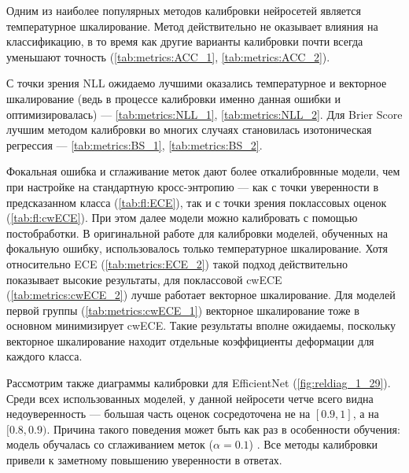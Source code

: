 \documentclass[12pt]{article}
\begin{document}
Одним из наиболее популярных методов калибровки нейросетей является температурное шкалирование. Метод действительно не оказывает влияния на классификацию, в то время как другие варианты калибровки почти всегда уменьшают точность (\autoref{tab:metrics:ACC_1}, \autoref{tab:metrics:ACC_2}). 

С точки зрения NLL ожидаемо лучшими оказались температурное и векторное шкалирование (ведь в процессе калибровки именно данная ошибки и оптимизировалась) --- \autoref{tab:metrics:NLL_1}, \autoref{tab:metrics:NLL_2}. Для Brier Score лучшим методом калибровки во многих случаях становилась изотоническая регрессия --- \autoref{tab:metrics:BS_1}, \autoref{tab:metrics:BS_2}. 

\begin{table}[h!]
    \begin{minipage}[h!]{0.47\textwidth}
        
    \end{minipage}\hfill
    \begin{minipage}[h!]{0.47\textwidth}
        
    \end{minipage}
\end{table}
Фокальная ошибка и сглаживание меток дают более откалибровнные модели, чем при настройке на стандартную кросс-энтропию — как с точки уверенности в предсказанном класса (\autoref{tab:fl:ECE}), так и с точки зрения поклассовых оценок (\autoref{tab:fl:cwECE}). При этом далее модели можно калибровать с помощью постобработки. В оригинальной работе \cite{focal_calib} для калибровки моделей, обученных на фокальную ошибку, использовалось только температурное шкалирование. Хотя относительно ECE (\autoref{tab:metrics:ECE_2}) такой подход действительно показывает высокие результаты, для поклассовой cwECE (\autoref{tab:metrics:cwECE_2}) лучше работает векторное шкалирование. Для моделей первой группы (\autoref{tab:metrics:cwECE_1}) векторное шкалирование тоже в основном минимизирует cwECE. Такие результаты вполне ожидаемы, поскольку векторное шкалирование находит отдельные коэффициенты деформации для каждого класса.

Рассмотрим также диаграммы калибровки для EfficientNet (\autoref{fig:reldiag_1_29}). Среди всех использованных моделей, у данной нейросети четче всего видна недоуверенность --- большая часть оценок сосредоточена не на $[0.9, 1]$, а на $[0.8, 0.9)$. Причина такого поведения может быть как раз в особенности обучения: модель обучалась со сглаживанием меток ($\alpha=0.1$) \cite{pretrained_imagenet}. Все методы калибровки привели к заметному повышению уверенности в ответах.
\end{document}

